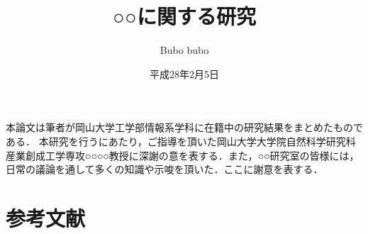\documentclass[11pt]{jreport}
\title{○○に関する研究}
\author{Bubo bubo}
\date{平成28年2月5日} %
\theoremstyle{mythmstyle}
\begin{document}
\maketitle








\acknowledgment
本論文は筆者が岡山大学工学部情報系学科に在籍中の研究結果をまとめたものである．
本研究を行うにあたり，ご指導を頂いた岡山大学大学院自然科学研究科
産業創成工学専攻○○○○教授に深謝の意を表する．また，○○研究室の皆様には，
日常の議論を通して多くの知識や示唆を頂いた．ここに謝意を表する．

\chapter*{参考文献}
\makeatletter
{}
\makeatother
\printbibliography[heading=none]
\end{document}
